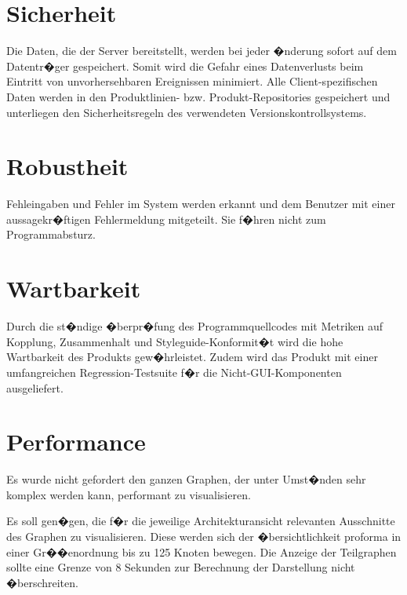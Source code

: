 \section{Sicherheit}
Die Daten, die der Server bereitstellt, werden bei jeder �nderung sofort auf dem Datentr�ger gespeichert.
Somit wird die Gefahr eines Datenverlusts beim Eintritt von unvorhersehbaren Ereignissen minimiert.
Alle Client-spezifischen Daten werden in den Produktlinien- bzw.
Produkt-Repositories gespeichert und unterliegen  den Sicherheitsregeln des verwendeten
Versionskontrollsystems.

\section{Robustheit}
Fehleingaben und Fehler im System werden erkannt und dem Benutzer mit einer aussagekr�ftigen 
Fehlermeldung mitgeteilt.
Sie f�hren nicht zum Programmabsturz.

\section{Wartbarkeit}
Durch die st�ndige �berpr�fung des Programmquellcodes mit Metriken auf Kopplung, Zusammenhalt und
Styleguide-Konformit�t wird die hohe Wartbarkeit des 
Produkts gew�hrleistet. Zudem wird das Produkt mit einer umfangreichen
Regression-Testsuite f�r die Nicht-GUI-Komponenten ausgeliefert.

\section{Performance}
Es wurde nicht gefordert den ganzen Graphen, der unter Umst�nden sehr komplex
werden kann, performant zu visualisieren.\par
Es soll gen�gen, die f�r die jeweilige Architekturansicht relevanten
Ausschnitte des Graphen zu visualisieren.
Diese werden sich der �bersichtlichkeit proforma in einer 
Gr��enordnung bis zu 125 Knoten bewegen. Die Anzeige der Teilgraphen sollte 
eine Grenze von 8 Sekunden zur Berechnung der Darstellung nicht �berschreiten.

